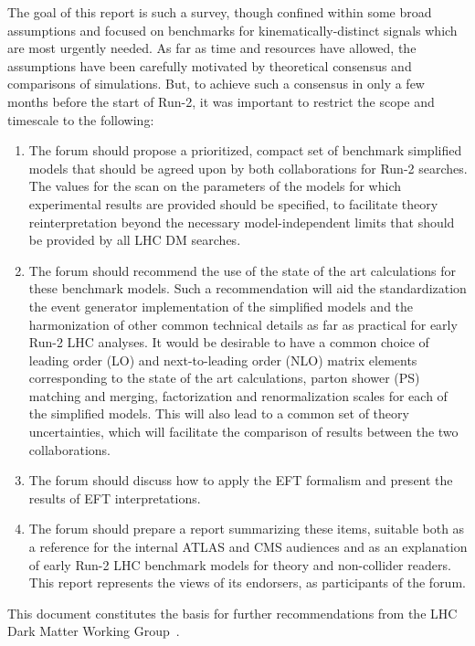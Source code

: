 The goal of this report is such a survey, though confined within some
broad assumptions and focused on benchmarks for kinematically-distinct
signals which are most urgently needed. As far as time and resources
have allowed, the assumptions have been carefully motivated by
theoretical consensus and comparisons of simulations. But, to achieve such a 
consensus in only a few months before the start of Run-2, it was
important to restrict the scope and timescale to the following:

\begin{enumerate}
\item The forum should propose a prioritized, compact set of benchmark
  simplified models that should be agreed upon by both collaborations for
  Run-2 searches. The values for the scan on the parameters of the models for which
  experimental results are provided should be specified, to facilitate theory reinterpretation 
  beyond the necessary model-independent limits that 
  should be provided by all LHC DM searches. 
\item The forum should recommend the use of the state of the art calculations
  for these benchmark models. Such a recommendation will aid the  
  standardization the event generator implementation
  of the simplified models and the harmonization of other common technical
  details as far as practical for early Run-2 LHC analyses. It
  would be desirable to have a common choice of leading order (LO) and 
  next-to-leading order (NLO) matrix elements corresponding to the state of the art calculations, 
  parton shower (PS) matching and merging, factorization and renormalization
  scales for each of the simplified models. This will also lead to a
  common set of theory uncertainties, which will facilitate the
  comparison of results between the two collaborations.
\item The forum should discuss how to apply the
  EFT formalism and present the results of EFT
  interpretations.
\item The forum should prepare a report summarizing these items,
  suitable both as a reference for the internal ATLAS and CMS
  audiences and as an explanation of early Run-2 LHC benchmark models for theory and non-collider
  readers. This report represents the views of its endorsers, as participants of the forum.
\end{enumerate}

This document constitutes the basis for further recommendations from the LHC Dark Matter Working Group~\cite{Boveia:2016mrp, Albert:2017onk, Abe:2018bpo}. 

